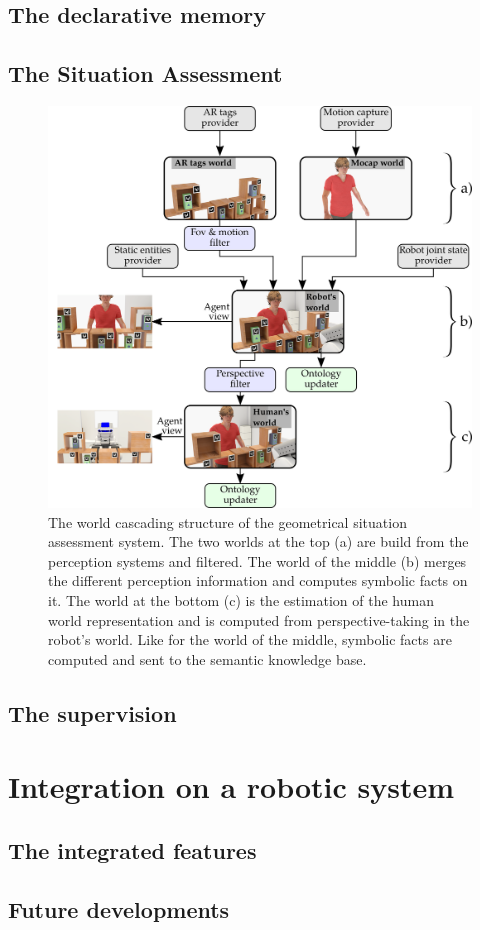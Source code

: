 \subsection{The declarative memory}

\subsection{The Situation Assessment}

\begin{figure}[ht!]
\centering
\includegraphics[width=\textwidth]{figures/chapter9/uwds/uwds.png}
\caption{\label{fig:chap9_uwds} The world cascading structure of the geometrical situation assessment system. The two worlds at the top (a) are build from the perception systems and filtered. The world of the middle (b) merges the different perception information and computes symbolic facts on it. The world at the bottom (c) is the estimation of the human world representation and is computed from perspective-taking in the robot's world. Like for the world of the middle, symbolic facts are computed and sent to the semantic knowledge base.}
\end{figure}

\subsection{The supervision}


\section{Integration on a robotic system}

\subsection{The integrated features}

\subsection{Future developments}